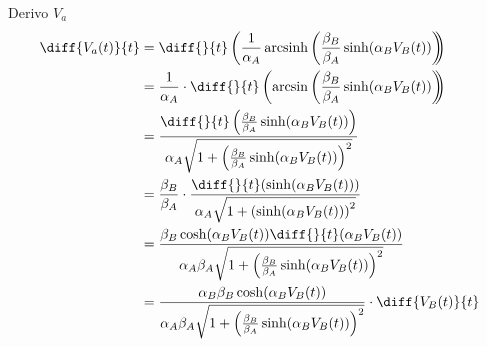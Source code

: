 \documentclass[12pt]{article}
\DeclareMathOperator{\arcsinh}{arcsinh}
\begin{document}
		Derivo $V_{a}$
		\begin{equation}
			\label{eq:derivata}
			\begin{split}
				\diff{V_{a}(t)}{t} &= \diff{}{t}\left(\frac{1}{\alpha_{A}} \arcsinh \left(\frac{\beta_{B}}{\beta_{A}} \sinh(\alpha_{B}V_{B}(t))\right)\hspace{-5px}\right)\\
				&= \frac{1}{\alpha_{A}}\cdot\diff{}{t}\left(\arcsin\left(\frac{\beta_{B}}{\beta_{A}}\sinh(\alpha_{B}V_{B}(t))\right)\hspace{-5px}\right)\\
				&= \frac{\diff{}{t}\left(\frac{\beta_{B}}{\beta_{A}}\sinh(\alpha_{B}V_{B}(t))\right)}{\alpha_{A}\sqrt{1+\left(\frac{\beta_{B}}{\beta_{A}}\sinh(\alpha_{B}V_{B}(t))\right)^{2}}}\\
				&= \frac{\beta_{B}}{\beta_{A}}\cdot\frac{\diff{}{t}(\sinh(\alpha_{B}V_{B}(t)))}{\alpha_{A}\sqrt{1+\left(\sinh(\alpha_{B}V_{B}(t))\right)^{2}}}\\
				&= \frac{\beta_{B}\cosh(\alpha_{B}V_{B}(t))\diff{}{t}(\alpha_{B}V_{B}(t))}{\alpha_{A}\beta_{A}\sqrt{1+\left(\frac{\beta_{B}}{\beta_{A}}\sinh(\alpha_{B}V_{B}(t))\right)^{2}}}\\
				&= \frac{\alpha_{B}\beta_{B}\cosh(\alpha_{B}V_{B}(t))}{\alpha_{A}\beta_{A}\sqrt{1+\left(\frac{\beta_{B}}{\beta_{A}}\sinh(\alpha_{B}V_{B}(t))\right)^{2}}}\cdot\diff{V_{B}(t)}{t}
			\end{split}
		\end{equation}
		
\end{document}

